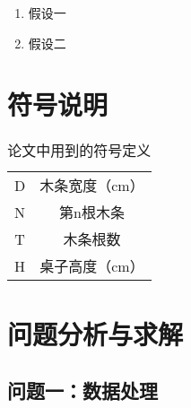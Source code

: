 \documentclass[bwprint]{gmcmthesis}
\begin{document}
\begin{enumerate}[itemindent=20pt]
	\item 假设一
	\item 假设二
\end{enumerate}


\section{符号说明}

\begin{table}[htbp]
    \centering
    \caption{论文中用到的符号定义}
	\begin{tabular}{cc}
	\toprule
	 \makebox[0.4\textwidth][c]{符号}	&  \makebox[0.5\textwidth][c]{意义} \\ 
	 \midrule
	 D	    & 木条宽度（cm）  \\
	 N	    & 第n根木条  \\ 
	   \midrule
	 T	    & 木条根数  \\
	 H	    & 桌子高度（cm）  \\
	 \bottomrule
	\end{tabular}
    \label{tab:addlabel}%
\end{table}%






\section{问题分析与求解}
\subsection{问题一：数据处理}
\end{document}
